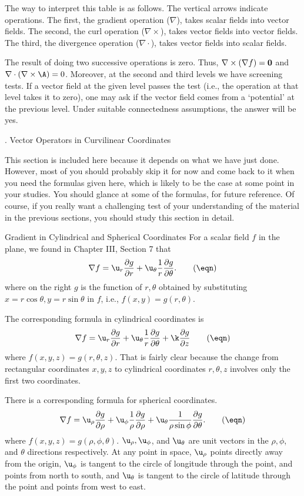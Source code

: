 The way to interpret this table is as follows. The vertical
arrows indicate operations.  The first, the gradient operation
($\nabla$), takes scalar fields into vector fields.  The
second, the curl operation ($\nabla\times$), takes vector fields
into vector fields.  The third, the divergence operation
($\nabla\cdot$), takes vector fields into scalar fields.

The result of doing two successive operations is
zero.  Thus, $\nabla\times(\nabla f) = \bold 0$ and
$\nabla\cdot(\nabla\times\A) = 0$.   Moreover, at the second
and third levels we have screening tests.  If a
vector field at the given level passes the test (i.e., 
the operation at that level takes it to zero),
one may ask
if the vector field comes from  a `potential' at
the previous level.
Under suitable connectedness
assumptions, the answer will be yes.


\bigskip

\bigskip
{}
\head \sn.  Vector Operators in Curvilinear Coordinates \endhead

This section is included here because it depends on what we
have just done.  However, most of you should probably skip it
for now and come back to it when you need the formulas given
here, which is likely to  be the case at some point in your
studies.  You should glance at some of the formulas, for
future reference.   Of course, if you really want a challenging
test of your understanding of the material in the previous
sections, you should study this section in detail.
%

\subhead Gradient in Cylindrical and Spherical Coordinates \endsubhead
For a scalar field $f$ in the plane,
we found 
 in
Chapter III, Section 7 that
\nexteqn
$$
\nabla f = \u_r\frac{\partial g}{\partial r} + \u_\theta
\frac 1r\frac{\partial g}{\partial\theta}.\tag\eqn
$$  
where on the right $g$ is the function of 
 $r, \theta$ obtained  by 
substituting $x = r\cos\theta, y = r\sin\theta$ in $f$,
i.e., $f(x,y) = g(r,\theta)$.

The corresponding formula in cylindrical coordinates is
\nexteqn
$$
\nabla f = \u_r\frac{\partial g}{\partial r} + \u_\theta
\frac 1r\frac{\partial g}{\partial\theta} 
+ \k \frac{\partial g}{\partial z}\tag\eqn
$$
where $f(x,y,z)=g(r,\theta,z)$.
That is fairly clear because the change from rectangular
coordinates $x,y,z$ to cylindrical coordinates $r,\theta,z$
involves only the first two coordinates.

There is a corresponding formula for spherical coordinates.
\nexteqn
$$ 
\nabla f = \u_\rho\frac{\partial g}{\partial \rho} + \u_\phi
\frac 1\rho\frac{\partial g}{\partial\rho} 
+ \u_\theta\frac 1{\rho\sin\phi}\frac{\partial g}{\partial \theta}.\tag\eqn
$$
where $f(x,y,z) = g(\rho,\phi,\theta)$.
$\u_\rho, \u_\phi$, and $\u_\theta$ are unit vectors
in the $\rho, \phi$, and $\theta$ directions respectively.
At any point in space,
$\u_\rho$ points directly away from the origin,
$\u_\phi$ is tangent to the circle of longitude through the point,
and points from north to south, and $\u_\theta$ is tangent to
the circle of latitude through the point and points from west to
east.
 
